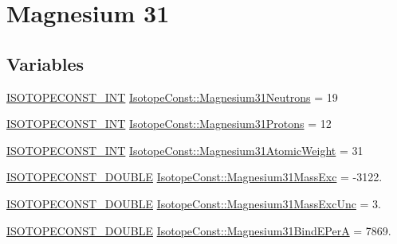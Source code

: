 \hypertarget{group___isotope_const-_magnesium-_mg31}{}\section{Magnesium 31}
\label{group___isotope_const-_magnesium-_mg31}
\subsection*{Variables}
\begin{DoxyCompactItemize}
\item 
\mbox{\hyperlink{group___isotope_const-_macros_ga5f18360b3e99483a35c32d789e62621c}{I\+S\+O\+T\+O\+P\+E\+C\+O\+N\+S\+T\+\_\+\+I\+NT}} \mbox{\hyperlink{group___isotope_const-_magnesium-_mg31_ga223b6fcba4e391e2172050d6f4452ad1}{Isotope\+Const\+::\+Magnesium31\+Neutrons}} = 19
\item 
\mbox{\hyperlink{group___isotope_const-_macros_ga5f18360b3e99483a35c32d789e62621c}{I\+S\+O\+T\+O\+P\+E\+C\+O\+N\+S\+T\+\_\+\+I\+NT}} \mbox{\hyperlink{group___isotope_const-_magnesium-_mg31_ga538195b18fb6384a40b9087c50a030ef}{Isotope\+Const\+::\+Magnesium31\+Protons}} = 12
\item 
\mbox{\hyperlink{group___isotope_const-_macros_ga5f18360b3e99483a35c32d789e62621c}{I\+S\+O\+T\+O\+P\+E\+C\+O\+N\+S\+T\+\_\+\+I\+NT}} \mbox{\hyperlink{group___isotope_const-_magnesium-_mg31_gae02ea26168497d68bd6eba4021c95782}{Isotope\+Const\+::\+Magnesium31\+Atomic\+Weight}} = 31
\item 
\mbox{\hyperlink{group___isotope_const-_macros_ga8f45a7272ce02c0b4c65c44636ed719a}{I\+S\+O\+T\+O\+P\+E\+C\+O\+N\+S\+T\+\_\+\+D\+O\+U\+B\+LE}} \mbox{\hyperlink{group___isotope_const-_magnesium-_mg31_ga9e07cd31f936ca9ab1bd96f928b4a678}{Isotope\+Const\+::\+Magnesium31\+Mass\+Exc}} = -\/3122.
\item 
\mbox{\hyperlink{group___isotope_const-_macros_ga8f45a7272ce02c0b4c65c44636ed719a}{I\+S\+O\+T\+O\+P\+E\+C\+O\+N\+S\+T\+\_\+\+D\+O\+U\+B\+LE}} \mbox{\hyperlink{group___isotope_const-_magnesium-_mg31_ga854241f2f05ea1e98cd0e685304e98cd}{Isotope\+Const\+::\+Magnesium31\+Mass\+Exc\+Unc}} = 3.
\item 
\mbox{\hyperlink{group___isotope_const-_macros_ga8f45a7272ce02c0b4c65c44636ed719a}{I\+S\+O\+T\+O\+P\+E\+C\+O\+N\+S\+T\+\_\+\+D\+O\+U\+B\+LE}} \mbox{\hyperlink{group___isotope_const-_magnesium-_mg31_gaddc90bf00b17f12c79e4c9c1898b95fa}{Isotope\+Const\+::\+Magnesium31\+Bind\+E\+PerA}} = 7869.
\item 

\end{DoxyCompactItemize}
